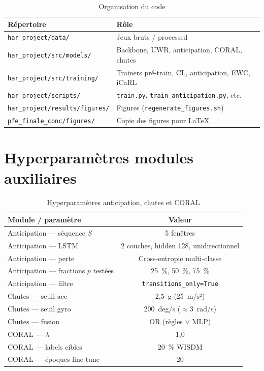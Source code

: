 \documentclass[a4paper,12pt]{report}
\begin{document}
\begin{table}[H]
\centering
\small
\begin{tabularx}{\textwidth}{|>{\raggedright\arraybackslash}p{4.2cm}|Y|}
\hline
\textbf{Répertoire} & \textbf{Rôle} \\
\hline
\texttt{har\_project/data/} & Jeux bruts / processed \\
\texttt{har\_project/src/models/} & Backbone, UWR, anticipation, CORAL, chutes \\
\texttt{har\_project/src/training/} & Trainers pré-train, CL, anticipation, EWC, iCaRL \\
\texttt{har\_project/scripts/} & \texttt{train.py}, \texttt{train\_anticipation.py}, etc. \\
\texttt{har\_project/results/figures/} & Figures (\texttt{regenerate\_figures.sh}) \\
\texttt{pfe\_finale\_conc/figures/} & Copie des figures pour LaTeX \\
\hline
\end{tabularx}
\caption{Organisation du code}
\label{tab:app_repo}
\end{table}

\section{Hyperparamètres modules auxiliaires}

\begin{table}[H]
\centering
\small
\begin{tabularx}{\textwidth}{|Y|c|}
\hline
\textbf{Module / paramètre} & \textbf{Valeur} \\
\hline
Anticipation — séquence $S$ & 5 fenêtres \\
Anticipation — LSTM & 2 couches, hidden 128, unidirectionnel \\
Anticipation — perte & Cross-entropie multi-classe \\
Anticipation — fractions $p$ testées & 25~\%, 50~\%, 75~\% \\
Anticipation — filtre & \texttt{transitions\_only=True} \\
Chutes — seuil acc & 2,5~g (25~m/s²) \\
Chutes — seuil gyro & 200~deg/s ($\approx$3~rad/s) \\
Chutes — fusion & OR (règles $\vee$ MLP) \\
CORAL — $\lambda$ & 1,0 \\
CORAL — labels cibles & 20~\% WISDM \\
CORAL — époques fine-tune & 20 \\
\hline
\end{tabularx}
\caption{Hyperparamètres anticipation, chutes et CORAL}
\label{tab:app_aux_hp}
\end{table}
\end{document}
